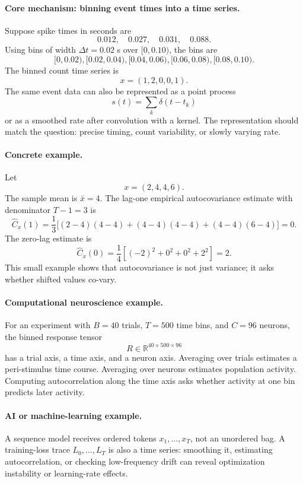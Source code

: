 \paragraph{Core mechanism: binning event times into a time series.}
Suppose spike times in seconds are
\[
0.012,\quad 0.027,\quad 0.031,\quad 0.088.
\]
Using bins of width \(\Delta t=0.02\) s over \([0,0.10)\), the bins are
\[
[0,0.02), [0.02,0.04), [0.04,0.06), [0.06,0.08), [0.08,0.10).
\]
The binned count time series is
\[
x=(1,2,0,0,1).
\]
The same event data can also be represented as a point process
\[
s(t)=\sum_k \delta(t-t_k)
\]
or as a smoothed rate after convolution with a kernel. The representation should match the question: precise timing, count variability, or slowly varying rate.

\paragraph{Concrete example.}
Let
\[
x=(2,4,4,6).
\]
The sample mean is \(\bar x=4\). The lag-one empirical autocovariance estimate with denominator \(T-1=3\) is
\[
\widehat C_x(1)=\frac{1}{3}\bigl[(2-4)(4-4)+(4-4)(4-4)+(4-4)(6-4)\bigr]=0.
\]
The zero-lag estimate is
\[
\widehat C_x(0)=\frac14\left[(-2)^2+0^2+0^2+2^2\right]=2.
\]
This small example shows that autocovariance is not just variance; it asks whether shifted values co-vary.

\paragraph{Computational neuroscience example.}
For an experiment with \(B=40\) trials, \(T=500\) time bins, and \(C=96\) neurons, the binned response tensor
\[
R\in\mathbb R^{40\times500\times96}
\]
has a trial axis, a time axis, and a neuron axis. Averaging over trials estimates a peri-stimulus time course. Averaging over neurons estimates population activity. Computing autocorrelation along the time axis asks whether activity at one bin predicts later activity.

\paragraph{AI or machine-learning example.}
A sequence model receives ordered tokens \(x_1,\ldots,x_T\), not an unordered bag. A training-loss trace \(L_0,\ldots,L_T\) is also a time series: smoothing it, estimating autocorrelation, or checking low-frequency drift can reveal optimization instability or learning-rate effects.


